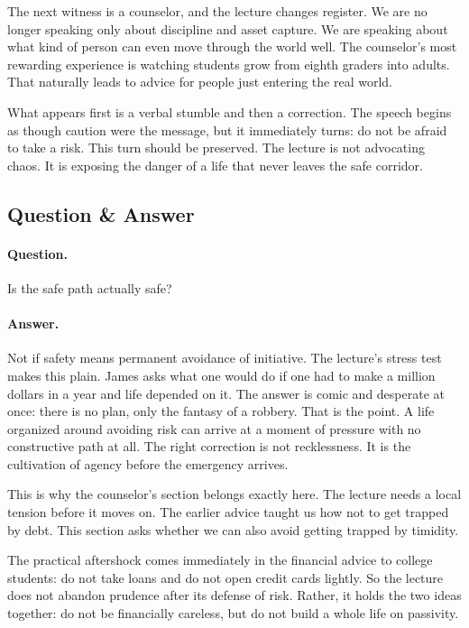 The next witness is a counselor, and the lecture changes register. We are no longer speaking only about discipline and asset capture. We are speaking about what kind of person can even move through the world well. The counselor's most rewarding experience is watching students grow from eighth graders into adults. That naturally leads to advice for people just entering the real world.

What appears first is a verbal stumble and then a correction. The speech begins as though caution were the message, but it immediately turns: do not be afraid to take a risk. This turn should be preserved. The lecture is not advocating chaos. It is exposing the danger of a life that never leaves the safe corridor.

\subsection{Question \& Answer}

\paragraph{Question.}
Is the safe path actually safe?

\paragraph{Answer.}
Not if safety means permanent avoidance of initiative. The lecture's stress test makes this plain. James asks what one would do if one had to make a million dollars in a year and life depended on it. The answer is comic and desperate at once: there is no plan, only the fantasy of a robbery. That is the point. A life organized around avoiding risk can arrive at a moment of pressure with no constructive path at all. The right correction is not recklessness. It is the cultivation of agency before the emergency arrives.

This is why the counselor's section belongs exactly here. The lecture needs a local tension before it moves on. The earlier advice taught us how not to get trapped by debt. This section asks whether we can also avoid getting trapped by timidity.

The practical aftershock comes immediately in the financial advice to college students: do not take loans and do not open credit cards lightly. So the lecture does not abandon prudence after its defense of risk. Rather, it holds the two ideas together: do not be financially careless, but do not build a whole life on passivity.


